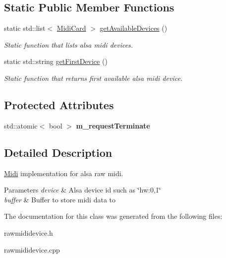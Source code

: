 \subsection*{Static Public Member Functions}
\begin{DoxyCompactItemize}
\item 
static std\-::list$<$ \hyperlink{structNl_1_1MidiCard}{Midi\-Card} $>$ \hyperlink{group__Midi_gaf6f05ac177aed9d05e06f34a776b5317}{get\-Available\-Devices} ()
\begin{DoxyCompactList}\small\item\em Static function that lists alsa midi devices. \end{DoxyCompactList}\item 
static std\-::string \hyperlink{group__Midi_ga9c95def97d341828fa23d3bf1a0b3c29}{get\-First\-Device} ()
\begin{DoxyCompactList}\small\item\em Static function that returns first available alsa midi device. \end{DoxyCompactList}\end{DoxyCompactItemize}
\subsection*{Protected Attributes}
\begin{DoxyCompactItemize}
\item 
\hypertarget{classNl_1_1RawMidiDevice_a9c773439bde734734607e1f4a39265a0}{std\-::atomic$<$ bool $>$ {\bfseries m\-\_\-request\-Terminate}}\label{classNl_1_1RawMidiDevice_a9c773439bde734734607e1f4a39265a0}

\end{DoxyCompactItemize}


\subsection{Detailed Description}
\hyperlink{classNl_1_1Midi}{Midi} implementation for alsa raw midi. 


\begin{DoxyParams}{Parameters}
{\em device} & Alsa device id such as \char`\"{}hw\-:0,1\char`\"{} \\
\hline
{\em buffer} & Buffer to store midi data to \\
\hline
\end{DoxyParams}


The documentation for this class was generated from the following files\-:\begin{DoxyCompactItemize}
\item 
rawmididevice.\-h\item 
rawmididevice.\-cpp\end{DoxyCompactItemize}
